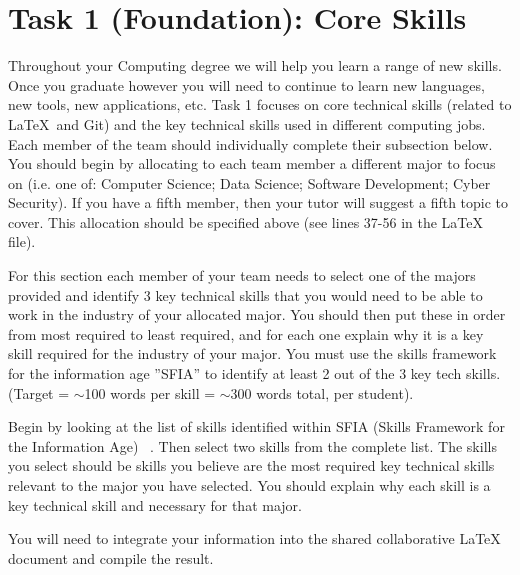\documentclass[a4paper, 11pt]{report}
\begin{document}

\tableofcontents


\newpage
\section{Task 1 (Foundation): Core Skills}

Throughout your Computing degree we will help you learn a range of new skills. Once you graduate however you will need to continue to learn new languages, new tools, new applications, etc. Task 1 focuses on core technical skills (related to \LaTeX\ and Git) and the key technical skills used in different computing jobs. Each member of the team should individually complete their subsection below. You should begin by allocating to each team member a different major to focus on (i.e. one of: Computer Science; Data Science; Software Development; Cyber Security). If you have a fifth member, then your tutor will suggest a fifth topic to cover. This allocation should be specified above (see lines 37-56 in the LaTeX file).

For this section each member of your team needs to select one of the majors provided and identify 3 key technical skills that you would need to be able to work in the industry of your allocated major. You should then put these in order from most required to least required, and for each one explain why it is a key skill required for the industry of your major. You must use the skills framework for the information age ''SFIA'' to identify at least 2 out of the 3 key tech skills. (Target = $\sim$100 words per skill = $\sim$300 words total, per student).

Begin by looking at the list of skills identified within SFIA (Skills Framework for the Information Age) ~\cite{sfia}. Then select two skills from the complete list. The skills you select should be skills you believe are the most required key technical skills relevant to the major you have selected. You should explain why each skill is a key technical skill and necessary for that major.

You will need to integrate your information into the shared collaborative LaTeX document and compile the result.\\[2mm]
\end{document}
